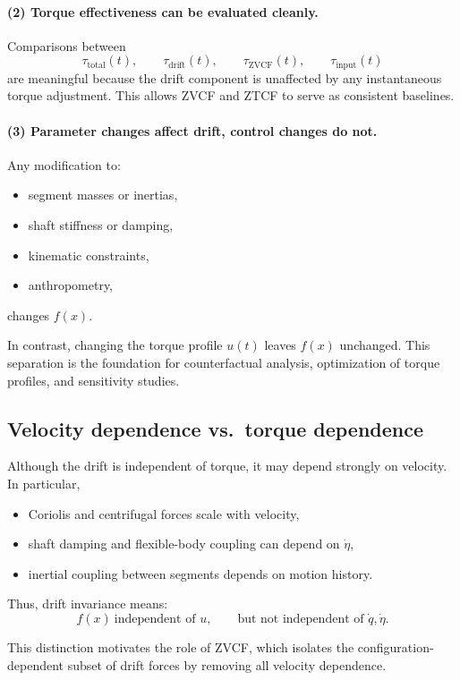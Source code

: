 \documentclass[12pt]{article}
\newcommand{\qd}{\dot{q}}
\newcommand{\etad}{\dot{\eta}}
\begin{document}
\paragraph{(2) Torque effectiveness can be evaluated cleanly.}
Comparisons between
\[
  \tau_{\text{total}}(t),\qquad \tau_{\text{drift}}(t),\qquad \tau_{\mathrm{ZVCF}}(t),\qquad \tau_{\mathrm{input}}(t)
\]
are meaningful because the drift component is unaffected by any instantaneous torque adjustment.  
This allows ZVCF and ZTCF to serve as consistent baselines.

\paragraph{(3) Parameter changes affect drift, control changes do not.}
Any modification to:
\begin{itemize}
  \item segment masses or inertias,
  \item shaft stiffness or damping,
  \item kinematic constraints,
  \item anthropometry,
\end{itemize}
changes \(f(x)\).  

In contrast, changing the torque profile \(u(t)\) leaves \(f(x)\) unchanged.  
This separation is the foundation for counterfactual analysis, optimization of torque profiles, and sensitivity studies.

\subsection{Velocity dependence vs.\ torque dependence}

Although the drift is independent of torque, it may depend strongly on velocity.  
In particular,
\begin{itemize}
  \item Coriolis and centrifugal forces scale with velocity,
  \item shaft damping and flexible-body coupling can depend on \(\etad\),
  \item inertial coupling between segments depends on motion history.
\end{itemize}

Thus, drift invariance means:
\[
f(x) \ \text{independent of } u,
\qquad
\text{but not independent of } \qd, \etad.
\]

This distinction motivates the role of ZVCF, which isolates the configuration-dependent subset of drift forces by removing all velocity dependence.
\end{document}
